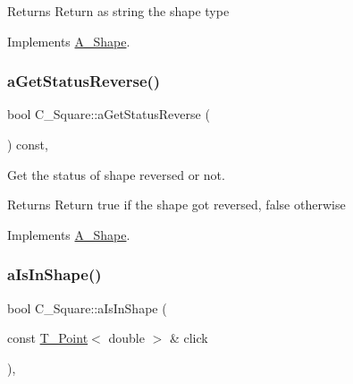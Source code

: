 \begin{DoxyReturn}{Returns}
Return as string the shape type 
\end{DoxyReturn}


Implements \hyperlink{classA__Shape_a1b202256a4e5dcb0edab4ab93a37122c}{A\+\_\+\+Shape}.

\mbox{\label{classC__Square_afe17127df3b112178973ad2182fe9204}} 
\subsubsection{\texorpdfstring{a\+Get\+Status\+Reverse()}{aGetStatusReverse()}}
{\footnotesize\ttfamily bool C\+\_\+\+Square\+::a\+Get\+Status\+Reverse (\begin{DoxyParamCaption}{ }\end{DoxyParamCaption}) const\hspace{0.3cm}{\ttfamily [override]}, {\ttfamily [virtual]}}



Get the status of shape reversed or not. 

\begin{DoxyReturn}{Returns}
Return true if the shape got reversed, false otherwise 
\end{DoxyReturn}


Implements \hyperlink{classA__Shape_a24991f7667367b646cae75f60df22e28}{A\+\_\+\+Shape}.

\mbox{\label{classC__Square_ac5ffad4afca051f117b43012fb4dc239}} 
\subsubsection{\texorpdfstring{a\+Is\+In\+Shape()}{aIsInShape()}}
{\footnotesize\ttfamily bool C\+\_\+\+Square\+::a\+Is\+In\+Shape (\begin{DoxyParamCaption}\item[{const \hyperlink{classT__Point}{T\+\_\+\+Point}$<$ double $>$ \&}]{click }\end{DoxyParamCaption})\hspace{0.3cm}{\ttfamily [override]}, {\ttfamily [virtual]}}



